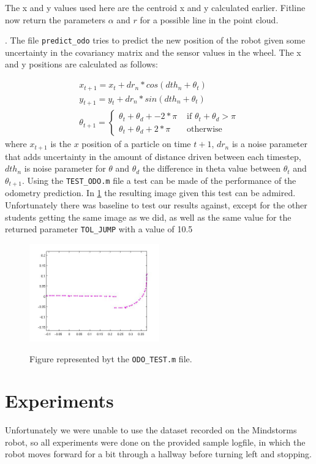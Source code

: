 \documentclass[a4paper, 20pt]{article}
\begin{document}
The x and y values used here are the centroid x and y calculated earlier.
Fitline now return the parameters $\alpha$ and $r$ for a possible line in the
point cloud.

. The file \texttt{predict\_odo} tries to predict the new position of the robot
given some uncertainty in the covariancy matrix and the sensor values in the
wheel.
The x and y positions are calculated as follows:

\begin{align*}
    x_{t+1} = x_{t} + dr_n * cos(dth_n + \theta_t)\\
    y_{t+1} = y_{t} + dr_n * sin(dth_n + \theta_t)\\
\theta_{t+1} = \left\{ \begin{array}{rl}
 \theta_t + \theta_d + -2*\pi &\mbox{ if $\theta_t + \theta_d > \pi$} \\
 \theta_t + \theta_d + 2*\pi&\mbox{ otherwise}
\end{array} \right.
\end{align*}
where $x_{t+1}$ is the $x$ position of a particle on time $t+1$, $dr_n$ is a noise
parameter that adds uncertainty in the amount of distance driven between each
timestep, $dth_n$ is noise parameter for $\theta$ and $\theta_d$ the
difference in theta value between $\theta_t$  and $\theta_{t+1}$.
Using the \texttt{TEST\_ODO.m} file a test can be made of the performance of the
odometry prediction. In \ref{fig:odo_test} the resulting image given this test
can be admired. Unfortunately there was baseline to test our results against,
except for the other students getting the same image as we did, as well as the
same value for the returned parameter \texttt{TOL\_JUMP} with a value of 10.5

\begin{figure}[!ht]
\centering
  \includegraphics[width=0.5\textwidth]{Odo_test.jpg}
  \label{fig:odo_test}
  \caption{Figure represented byt the \texttt{ODO\_TEST.m} file. } 
\end{figure}


\section{Experiments}
Unfortunately we were unable to use the dataset recorded on the Mindstorms
robot, so all experiments were done on the provided sample logfile, in which the
robot moves forward for a bit through a hallway before turning left and
stopping.
\end{document}
